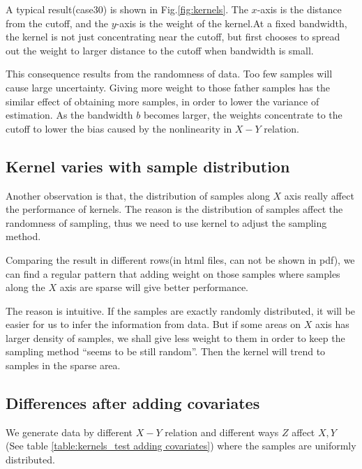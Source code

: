 \documentclass[a4 paper,12pt]{article}
\begin{document}
A typical result(case30) is shown in Fig.\ref{fig:kernels}. The $x$-axis is the distance from the cutoff, and the $y$-axis is the weight of the kernel.At a fixed bandwidth, the kernel is not just concentrating near the cutoff, but first chooses to spread out the weight to larger distance to the cutoff when bandwidth is small.

This consequence results from the randomness of data. Too few samples will cause large uncertainty. Giving more weight to those father samples has the similar effect of obtaining more samples, in order to lower the variance of estimation. As the bandwidth $b$ becomes larger, the weights concentrate to the cutoff to lower the bias caused by the nonlinearity in $X-Y$ relation.

\subsection*{Kernel varies with sample distribution}

Another observation is that, the distribution of samples along $X$ axis really affect the performance of kernels. The reason is the distribution of samples affect the randomness of sampling, thus we need to use kernel to adjust the sampling method.

Comparing the result in different rows(in html files, can not be shown in pdf), we can find a regular pattern that adding weight on those samples where samples along the $X$ axis are sparse will give better performance. 

The reason is intuitive. If the samples are exactly randomly distributed, it will be easier for us to infer the information from data. But if some areas on $X$ axis has larger density of samples, we shall give less weight to them in order to keep the sampling method ``seems to be still random''. Then the kernel will trend to samples in the sparse area.


\subsection{ Differences after adding covariates}
We generate data by different $X-Y$ relation and different ways $Z$ affect $X,Y$ (See table \ref{table:kernels_test adding covariates}) where the samples are uniformly distributed.
\end{document}
